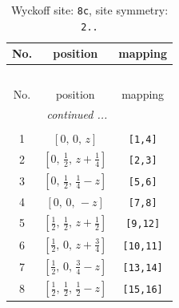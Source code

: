 \documentclass[fleqn,8pt]{jsarticle}
\begin{document}
\renewcommand{\arraystretch}{1.2}
\begin{longtable}{ccc}
\caption{Wyckoff site: {\tt 8c}, site symmetry: {\tt 2..}}
 \\
 \hline \hline
No. & position & mapping \\ \hline \endfirsthead

\multicolumn{2}{l}{\tablename\ \thetable{}} \\
 \hline \hline
No. & position & mapping \\ \hline \endhead

 \hline \hline
\multicolumn{2}{r}{\footnotesize\it continued ...} \\ \endfoot

 \hline \hline
\multicolumn{2}{r}{} \\ \endlastfoot

1 & $\left[ 0,\, 0,\, z \right]$ & {\tt [1,4]} \\ \hline
2 & $\left[ 0,\, \frac{1}{2},\, z + \frac{1}{4} \right]$ & {\tt [2,3]} \\ \hline
3 & $\left[ 0,\, \frac{1}{2},\, \frac{1}{4} - z \right]$ & {\tt [5,6]} \\ \hline
4 & $\left[ 0,\, 0,\, - z \right]$ & {\tt [7,8]} \\ \hline
5 & $\left[ \frac{1}{2},\, \frac{1}{2},\, z + \frac{1}{2} \right]$ & {\tt [9,12]} \\ \hline
6 & $\left[ \frac{1}{2},\, 0,\, z + \frac{3}{4} \right]$ & {\tt [10,11]} \\ \hline
7 & $\left[ \frac{1}{2},\, 0,\, \frac{3}{4} - z \right]$ & {\tt [13,14]} \\ \hline
8 & $\left[ \frac{1}{2},\, \frac{1}{2},\, \frac{1}{2} - z \right]$ & {\tt [15,16]} \\
\end{longtable}
\renewcommand{\arraystretch}{1.2}
\end{document}
